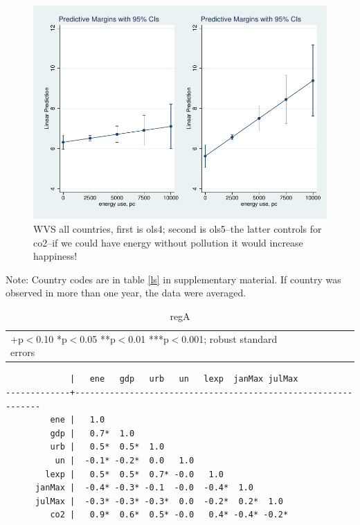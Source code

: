 \documentclass[10pt, letterpaper]{article}
\begin{document}
\begin{spacing}{1.4}
\begin{figure}[H]
 \includegraphics[width=6in]{graphsAndTables/ols4ols5.pdf}\centering
\caption{WVS all countries, first is ols4; second is ols5--the latter controls
  for co2--if we could have energy without pollution it would increase happiness! }\label{ols4ols5}
\end{figure}
{\scriptsize Note: Country codes are in table \ref{ls} in supplementary
  material. If country was observed in more than one year, the data were averaged.}


\begin{table}[H]\centering \caption{regA} \label{regA} \begin{scriptsize} \begin{tabular}{p{1.4in}p{.43in}p{.43in}p{.43in}p{.43in}p{.43in}p{.43in}p{.43in}p{.43in}p{.43in}p{.43 in}p{.43in}p{.43 in}}\hline  \hline\multicolumn{6}{l}{+p$<$0.10 *p$<$0.05 **p$<$0.01 ***p$<$0.001; robust standard errors} \end{tabular}\end{scriptsize}\end{table}

\begin{verbatim}
             |   ene   gdp   urb   un   lexp  janMax julMax
-------------+---------------------------------------------------------------
         ene |   1.0 
         gdp |   0.7*  1.0 
         urb |   0.5*  0.5*  1.0 
          un |  -0.1* -0.2*  0.0   1.0 
        lexp |   0.5*  0.5*  0.7* -0.0   1.0 
      janMax |  -0.4* -0.3* -0.1  -0.0  -0.4*  1.0 
      julMax |  -0.3* -0.3* -0.3*  0.0  -0.2*  0.2*  1.0 
         co2 |   0.9*  0.6*  0.5* -0.0   0.4* -0.4* -0.2*


\end{verbatim}
\end{spacing}
\end{document}
